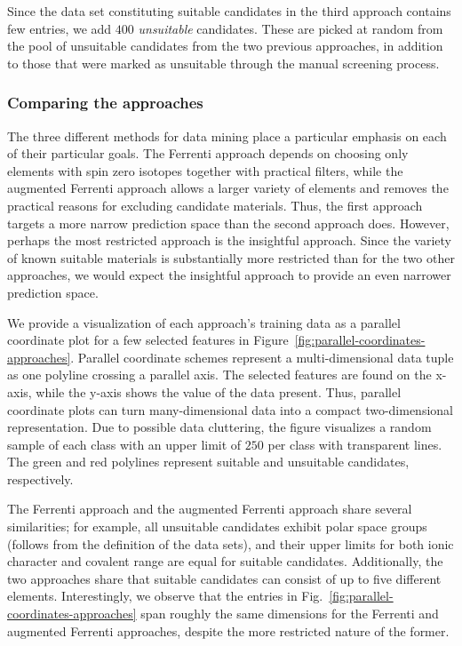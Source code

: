 \documentclass[superscriptaddress,unsortedaddress,
 amsmath,amssymb,
 aps,
]{revtex4-2}
\newcommand{\marianne}[1]{\textcolor{blue}{#1}}
\begin{document}
Since the data set constituting suitable candidates in the third approach contains few entries, we add $400$ \emph{unsuitable} candidates. These are picked at random from the pool of unsuitable candidates from the two previous approaches, in addition to those that were marked as unsuitable through the manual screening process. 

\subsubsection*{Comparing the approaches}
The three different methods for data mining place a particular emphasis on each of their particular goals. The Ferrenti approach depends on choosing only elements with spin zero isotopes together with practical filters, while the augmented Ferrenti approach allows a larger variety of elements and removes the practical reasons for excluding candidate materials. Thus, the first approach targets a more narrow prediction space than the second approach does. However, perhaps the most restricted approach is the insightful approach. Since the variety of known suitable materials is substantially more restricted than for the two other approaches, we would expect the insightful approach to provide an even narrower prediction space. 


We provide a visualization of each approach's training data as a parallel coordinate plot for a few selected features in Figure~\ref{fig:parallel-coordinates-approaches}. Parallel coordinate schemes \cite{Inselberga1990, Inselberg1985} represent a multi-dimensional data tuple as one polyline crossing a parallel axis. The selected features are found on the x-axis, while the y-axis shows the value of the data present. Thus, parallel coordinate plots can turn many-dimensional data into a compact two-dimensional representation. Due to possible data cluttering, the figure visualizes a random sample of each class with an upper limit of $250$ per class with transparent lines. The green and red polylines represent suitable and unsuitable candidates, respectively. 

The Ferrenti approach and the augmented Ferrenti approach share several similarities; 
for example, all unsuitable candidates exhibit polar space groups (follows from the definition of the data sets), and their upper limits for both ionic character and covalent range are equal for suitable candidates.  
Additionally, the two approaches share that suitable candidates can consist of up to five different elements. 
Interestingly, we observe that
the entries in Fig.~\ref{fig:parallel-coordinates-approaches} span roughly the same dimensions for the Ferrenti and augmented Ferrenti approaches, despite the more restricted nature of the former. 
\end{document}
